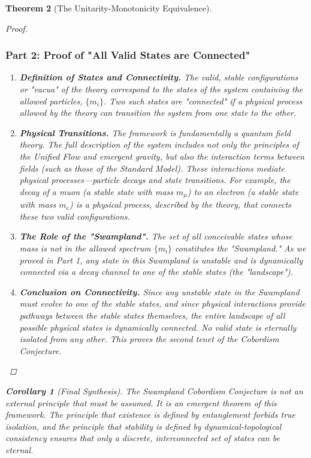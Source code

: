 \documentclass[11pt, letterpaper]{report}
\theoremstyle{plain} %
\newtheorem{theorem}{Theorem}[chapter]
\newtheorem{corollary}[theorem]{Corollary}
\theoremstyle{definition} %
\theoremstyle{remark} %
\begin{document}
\begin{theorem}[The Unitarity-Monotonicity Equivalence]
\begin{proof}
\subsubsection*{Part 2: Proof of "All Valid States are Connected"}

\begin{enumerate}
    \item \textbf{Definition of States and Connectivity.} The valid, stable configurations or "vacua" of the theory correspond to the states of the system containing the allowed particles, $\{m_i\}$. Two such states are "connected" if a physical process allowed by the theory can transition the system from one state to the other.

    \item \textbf{Physical Transitions.} The framework is fundamentally a quantum field theory. The full description of the system includes not only the principles of the Unified Flow and emergent gravity, but also the interaction terms between fields (such as those of the Standard Model). These interactions mediate physical processes—particle decays and state transitions. For example, the decay of a muon (a stable state with mass $m_\mu$) to an electron (a stable state with mass $m_e$) is a physical process, described by the theory, that connects these two valid configurations.

    \item \textbf{The Role of the "Swampland".} The set of all conceivable states whose mass is not in the allowed spectrum $\{m_i\}$ constitutes the "Swampland." As we proved in Part 1, any state in this Swampland is unstable and is dynamically connected via a decay channel to one of the stable states (the "landscape").

    \item \textbf{Conclusion on Connectivity.} Since any unstable state in the Swampland must evolve to one of the stable states, and since physical interactions provide pathways between the stable states themselves, the entire landscape of all possible physical states is dynamically connected. No valid state is eternally isolated from any other. This proves the second tenet of the Cobordism Conjecture.
\end{enumerate}
\end{proof}

\begin{corollary}[Final Synthesis]
The Swampland Cobordism Conjecture is not an external principle that must be assumed. It is an emergent theorem of this framework. The principle that existence is defined by entanglement forbids true isolation, and the principle that stability is defined by dynamical-topological consistency ensures that only a discrete, interconnected set of states can be eternal.
\end{corollary}







\end{theorem}
\end{document}
